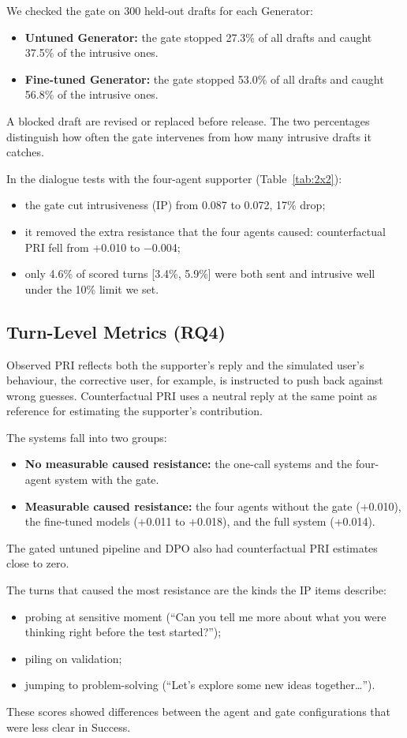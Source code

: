 \documentclass[journal]{IEEEtran}
\begin{document}
We checked the gate on 300 held-out drafts for each Generator:
\begin{itemize}
\item \textbf{Untuned Generator:} the gate stopped 27.3\% of all drafts and caught 37.5\% of the intrusive ones.
\item \textbf{Fine-tuned Generator:} the gate stopped 53.0\% of all drafts and caught 56.8\% of the intrusive ones.
\end{itemize}
A blocked draft are revised or replaced before release. The two percentages distinguish how often the gate intervenes from how many intrusive drafts it catches.

In the dialogue tests with the four-agent supporter (Table~\ref{tab:2x2}):
\begin{itemize}
\item the gate cut intrusiveness (IP) from 0.087 to 0.072, 17\% drop;
\item it removed the extra resistance that the four agents caused: counterfactual PRI fell from +0.010 to $-$0.004;
\item only 4.6\% of scored turns [3.4\%, 5.9\%] were both sent and intrusive well under the 10\% limit we set.
\end{itemize}

\subsection{Turn-Level Metrics (RQ4)}\label{sec:r-turn}
Observed PRI reflects both the supporter's reply and the simulated user's behaviour, the corrective user, for example, is instructed to push back against wrong guesses. Counterfactual PRI uses a neutral reply at the same point as reference for estimating the supporter's contribution.

The systems fall into two groups:
\begin{itemize}
\item \textbf{No measurable caused resistance:} the one-call systems and the four-agent system with the gate.
\item \textbf{Measurable caused resistance:} the four agents without the gate (+0.010), the fine-tuned models (+0.011 to +0.018), and the full system (+0.014).
\end{itemize}
The gated untuned pipeline and DPO also had counterfactual PRI estimates close to zero.

The turns that caused the most resistance are the kinds the IP items describe:
\begin{itemize}
\item probing at sensitive moment (``Can you tell me more about what you were thinking right before the test started?'');
\item piling on validation;
\item jumping to problem-solving (``Let's explore some new ideas together\ldots'').
\end{itemize}
These scores showed differences between the agent and gate configurations that were less clear in Success.
\end{document}
